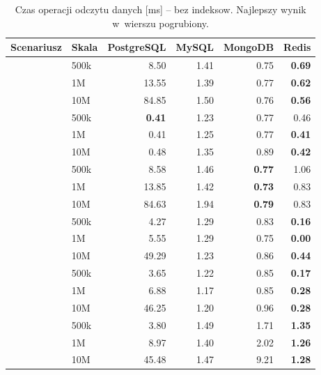 \begin{table}[H]
\centering
\caption{Czas operacji odczytu danych [ms] -- bez indeksow. Najlepszy wynik w~wierszu pogrubiony.}
\label{tab:read_no}
\small
\begin{tabular}{@{}llrrrr@{}}
\toprule
\textbf{Scenariusz} & \textbf{Skala} & \textbf{PostgreSQL} & \textbf{MySQL} & \textbf{MongoDB} & \textbf{Redis} \\
\midrule
{}
 & 500k & 8.50 & 1.41 & 0.75 & \textbf{0.69} \\
 & 1M & 13.55 & 1.39 & 0.77 & \textbf{0.62} \\
 & 10M & 84.85 & 1.50 & 0.76 & \textbf{0.56} \\
\midrule
{}
 & 500k & \textbf{0.41} & 1.23 & 0.77 & 0.46 \\
 & 1M & 0.41 & 1.25 & 0.77 & \textbf{0.41} \\
 & 10M & 0.48 & 1.35 & 0.89 & \textbf{0.42} \\
\midrule
{}
 & 500k & 8.58 & 1.46 & \textbf{0.77} & 1.06 \\
 & 1M & 13.85 & 1.42 & \textbf{0.73} & 0.83 \\
 & 10M & 84.63 & 1.94 & \textbf{0.79} & 0.83 \\
\midrule
{}
 & 500k & 4.27 & 1.29 & 0.83 & \textbf{0.16} \\
 & 1M & 5.55 & 1.29 & 0.75 & \textbf{0.00} \\
 & 10M & 49.29 & 1.23 & 0.86 & \textbf{0.44} \\
\midrule
{}
 & 500k & 3.65 & 1.22 & 0.85 & \textbf{0.17} \\
 & 1M & 6.88 & 1.17 & 0.85 & \textbf{0.28} \\
 & 10M & 46.25 & 1.20 & 0.96 & \textbf{0.28} \\
\midrule
{}
 & 500k & 3.80 & 1.49 & 1.71 & \textbf{1.35} \\
 & 1M & 8.97 & 1.40 & 2.02 & \textbf{1.26} \\
 & 10M & 45.48 & 1.47 & 9.21 & \textbf{1.28} \\
\bottomrule
\end{tabular}
\end{table}
